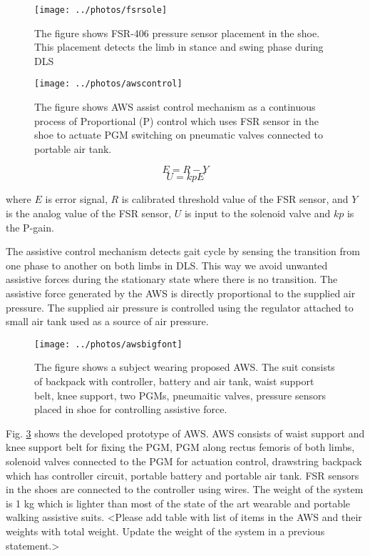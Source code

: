\documentclass[letterpaper, 10 pt, conference]{ieeeconf}  %
\begin{document}
\begin{figure}
	\centering
	\texttt{[image: ../photos/fsrsole]}
	\caption{The figure shows FSR-406 pressure sensor placement in the shoe. This placement detects the limb in stance and swing phase during DLS}
	\label{fig:fsrsole}
\end{figure}

\begin{figure}
	\centering
	\texttt{[image: ../photos/awscontrol]}
	\caption{The figure shows AWS assist control mechanism as a continuous process of Proportional (P) control which uses FSR sensor in the shoe to actuate PGM switching on pneumatic valves connected to portable air tank.}
	\label{fig:awssystem}
\end{figure}
\begin{equation}\label{kevalue}
E = R - Y 
\end{equation}
\begin{equation}\label{uvalue}
U = kpE
\end{equation}

where $E$ is error signal, $R$ is calibrated threshold value of the FSR sensor, and $Y$ is the analog value of the FSR sensor, $U$ is input to the solenoid valve and $kp$ is the P-gain. 

The assistive control mechanism detects gait cycle by sensing the transition from one phase to another on both limbs in DLS. This way we avoid unwanted assistive forces during the stationary state where there is no transition. The assistive force generated by the AWS is directly proportional to the supplied air pressure. The supplied air pressure is controlled using the regulator attached to small air tank used as a source of air pressure.  

\begin{figure}
	\centering
	\texttt{[image: ../photos/awsbigfont]}
	\caption{The figure shows a subject wearing proposed AWS. The suit consists of backpack with controller, battery and air tank, waist support belt, knee support, two PGMs, pneumaitic valves, pressure sensors placed in shoe for controlling assistive force.}
	\label{fig:awsbigfont}
\end{figure}

Fig. \ref{fig:awsbigfont} shows the developed prototype of AWS. AWS consists of waist support and knee support belt for fixing the PGM, PGM along rectus femoris of both limbs, solenoid valves connected to the PGM for actuation control, drawstring backpack which has controller circuit, portable battery and portable air tank. FSR sensors in the shoes are connected to the controller using wires. The weight of the system is 1 kg which is lighter than most of the state of the art wearable and portable walking assistive suits. <Please add table with list of items in the AWS and their weights with total weight. Update the weight of the system in a previous statement.>
\end{document}
